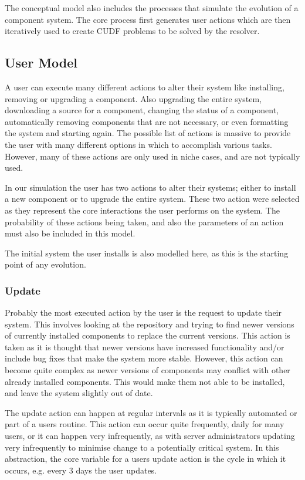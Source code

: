 The conceptual model also includes the processes that simulate the evolution of a component system.
The core process first generates user actions which are then iteratively used to create CUDF problems to be solved by the resolver.

\subsection{User Model}
A user can execute many different actions to alter their system like installing, removing or upgrading a component.
Also upgrading the entire system, downloading a source for a component, changing the status of a component, 
automatically removing components that are not necessary, or even formatting the system and starting again.
The possible list of actions is massive to provide the user with many different options in which to accomplish various tasks.
However, many of these actions are only used in niche cases, and are not typically used.

In our simulation the user has two actions to alter their systems; either to install a new component or to upgrade the entire system.
These two action were selected as they represent the core interactions the user performs on the system.
The probability of these actions being taken, and also the parameters of an action must also be included in this model.

The initial system the user installs is also modelled here, as this is the starting point of any evolution.

\subsubsection{Update}
Probably the most executed action by the user is the request to update their system.
This involves looking at the repository and trying to find newer versions of currently installed components to replace the current versions.
This action is taken as it is thought that newer versions have increased functionality and/or include bug fixes that make the system more stable.
However, this action can become quite complex as newer versions of components may conflict with other already installed components.
This would make them not able to be installed, and leave the system slightly out of date.

The update action can happen at regular intervals as it is typically automated or part of a users routine.
This action can occur quite frequently, daily for many users, 
or it can happen very infrequently, 
as with server administrators updating very infrequently to minimise change to a potentially critical system.
In this abstraction, the core variable for a users update action is the cycle in which it occurs,
e.g. every 3 days the user updates.

